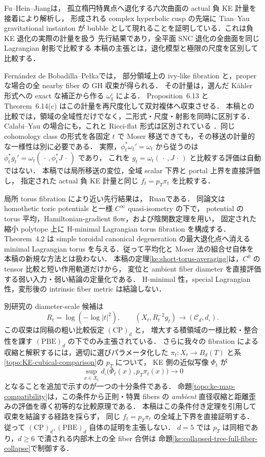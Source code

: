 Fu--Hein--Jiang\cite[\S1.1, Main Theorem]{FuHeinJiangCusp}は，
孤立楕円特異点へ退化する六次曲面の actual 負 KE 計量を接着により解析し，
形成される complex hyperbolic cusp の先端に Tian--Yau gravitational instanton が
bubble として現れることを証明している．これは負 KE 退化の実際の計量を扱う
先行結果であり，全平面 SNC 退化の全曲面を同じ Lagrangian 射影で比較する
本稿の主張とは，退化模型と極限の尺度を区別して比較する．

Fernández de Bobadilla--Pełka\cite[Theorem 6.14(b),(c)]{FBP}では，
部分領域上の ivy-like fibration と，proper な場合の全 nearby fiber の GH 収束が得られる．
その計量は，選んだ Kähler 形式への exact な補正から作る $\omega_q^\varepsilon$ による．
Proposition~6.13 と Theorem~6.14(c) はこの計量を再尺度化して双対複体へ収束させる．
本稿との比較では，領域の全域性だけでなく，二形式・尺度・射影を同時に区別する．
Calabi--Yau の場合にも，これと Ricci-flat 形式は区別されている
\cite[Introduction, Remark 7.4]{FBP}．同じ cohomology class の形式を各固定 $t$ で
Moser 移送できても，その移送の計量的な一様性は別に必要である．
実際，$\phi_t^*\omega_t'=\omega_t$ から従うのは
$\phi_t^*g_t'=\omega_t(\,\cdot\,,\phi_t^*J\,\cdot\,)$ であり，
これを $g_t=\omega_t(\,\cdot\,,J\,\cdot\,)$ と比較する評価は自動ではない．
本稿では局所移送の変位，全域 scalar 下界と portal 上界を直接評価し，
指定された actual 負 KE 計量と同じ $f_t=p_T\pi_t$ を比較する．

局所 torus fibration により近い先行結果は，
Ruan\cite[Proposition~3.1, Lemma~3.3, Theorem~3.1]{RuanHMinimal}である．
同論文は homothetic toric potentials と一様 $C^\infty$ quasi-isometry の下で，
potential の torus 平均，Hamiltonian-gradient flow，および陰関数定理を用い，
固定された縮小 polytope 上に H-minimal Lagrangian torus fibration を構成する．
Theorem~4.2 は simple toroidal canonical degeneration の最大退化点へ消える
minimal Lagrangian torus を与える．従って平均化と Moser 法の組合せ自体を
本稿の新規な方法とは扱わない．
本稿の定理\ref{ke:short-torus-averaging}は，$C^0$ の tensor 比較と短い作用軌道だけから，
変位と ambient fiber diameter を直接評価する弱い入力・弱い結論の定量化である．
H-minimal 性，special Lagrangian 性，変形後の intrinsic fiber metric は結論しない．

別研究\cite{KECubicalCurrent}の diameter-scale 候補は
\[
 R_t=\log(-\log|t|^2),\qquad
 (X_t,R_t^{-2}g_t)\longrightarrow(\mathcal C_d,d_\square).
\]
この収束は同稿の粗い比較仮定 $\mathrm{(CP)}_d$ と，
増大する積領域の一様比較・整合性を課す $\mathrm{(PBE)}_d$ の下でのみ主張されている．
さらに我々の fibration による収縮と解釈するには，適切に選びパラメータ化した
$\pi_t:X_t\to B_d(T)$ と系\ref{topo:KE-cubical-comparison}の $p_T$ について，
KE 側の近似写像 $\Phi_t$ が
\[
 \sup_{x\in X_t}d_\square\bigl(\Phi_t(x),p_T\pi_t(x)\bigr)\longrightarrow0
\]
となることを追加で示すのが一つの十分条件である．
命題\ref{topo:ke-map-compatibility}は，この条件から正則・特異 fibers の
\emph{ambient} 直径収縮と距離歪みの評価を導く初等的な比較原理である．
本稿はこの条件付き定理を引用して収束を結論する経路を採らず，
同じ $f_t=p_T\pi_t$ の全域上下界を直接証明する．
従って $\mathrm{(CP)}_d,\mathrm{(PBE)}_d$ 自体の証明を主張しない．
$d=5$ では $p_T$ は同相であり，$d\ge6$ で潰される内部木上の全 fiber 合併は
命題\ref{ke:collapsed-tree-full-fiber-collapse}で制御する．


